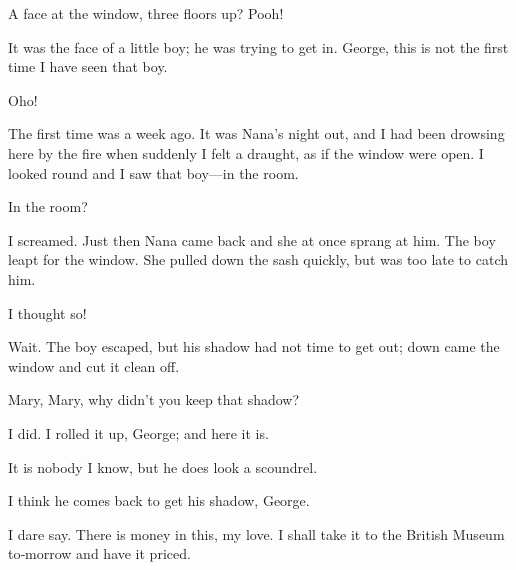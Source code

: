 \begin{drama}
A face at the window, three floors up?
Pooh!

\mrsdarlingspeaks
It was the face of a little boy; he was trying to get in.
George, this is not the first time I have seen that boy.

Oho!

The first time was a week ago.
It was Nana’s night out, and I had been drowsing here by the fire when suddenly I felt a draught,
as if the window were open.
I looked round and I saw that boy—in the room.

\mrdarlingspeaks
In the room?

\mrsdarlingspeaks
I screamed.
Just then Nana came back and she at once sprang at him.
The boy leapt for the window.
She pulled down the sash quickly, but was too late to catch him.

I thought so!

\mrsdarlingspeaks
Wait.
The boy escaped, but his shadow had not time to get out; down came the window and cut it clean off.

Mary, Mary, why didn’t you keep that shadow?

I did.
I rolled it up, George; and here it is.


\mrdarlingspeaks
It is nobody I know, but he does look a scoundrel.

\mrsdarlingspeaks
I think he comes back to get his shadow, George.

I dare say.
There is money in this, my love.
I shall take it to the British Museum to‐morrow and have it priced.



\end{drama}
